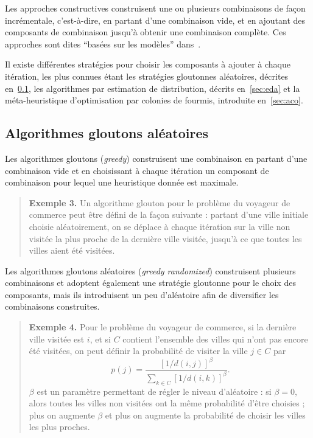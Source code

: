 \documentclass[12pt,a4paper]{book}
\begin{document}
Les approches constructives construisent une ou plusieurs combinaisons de façon incrémentale, c'est-à-dire, en partant d'une combinaison vide, et en ajoutant des composants de combinaison jusqu'à obtenir une combinaison complète. Ces approches sont dites ``basées sur les modèles'' dans~\cite{zlochin2004}.

Il existe différentes stratégies pour choisir les composants à ajouter à chaque itération, les plus connues étant les stratégies gloutonnes aléatoires, décrites en~\ref{sec:gloutons}, les algorithmes par estimation de distribution, décrits en~\ref{sec:eda} et la méta-heuristique d'optimisation par colonies de fourmis, introduite en~\ref{sec:aco}.

\subsection{Algorithmes gloutons aléatoires}
\label{sec:gloutons}

Les algorithmes gloutons (\textit{greedy}) construisent une combinaison en partant d'une combinaison vide et en choisissant à chaque itération un composant de combinaison pour lequel une heuristique donnée est maximale.

\begin{quote}
\textbf{Exemple 3.} Un algorithme glouton pour le problème du voyageur de commerce peut être défini de la façon suivante : partant d'une ville initiale choisie aléatoirement, on se déplace à chaque itération sur la ville non visitée la plus proche de la dernière ville visitée, jusqu'à ce que toutes les villes aient été visitées.
\end{quote}

Les algorithmes gloutons aléatoires (\textit{greedy randomized}) construisent plusieurs combinaisons et adoptent également une stratégie gloutonne pour le choix des composants, mais ils introduisent un peu d'aléatoire afin de diversifier les combinaisons construites.

\begin{quote}
\textbf{Exemple 4.} Pour le problème du voyageur de commerce, si la dernière ville visitée est $i$, et si $C$ contient l'ensemble des villes qui n'ont pas encore été visitées, on peut définir la probabilité de visiter la ville $j \in C$ par
\[
p(j) = \frac{[1/d(i,j)]^\beta}{\sum_{k \in C} [1/d(i,k)]^\beta}.
\]
$\beta$ est un paramètre permettant de régler le niveau d'aléatoire : si $\beta = 0$, alors toutes les villes non visitées ont la même probabilité d'être choisies ; plus on augmente $\beta$ et plus on augmente la probabilité de choisir les villes les plus proches.
\end{quote}
\end{document}
